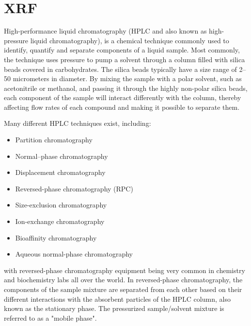 

\section{XRF}

High-performance liquid chromatography (HPLC and also known as high-pressure liquid chromatography), is a chemical technique commonly used to identify, quantify and separate components of a liquid sample. Most commonly, the technique uses pressure to pump a solvent through a column filled with silica beads covered in carbohydrates. The silica beads typically have a size range of 2–50 micrometers in diameter. By mixing the sample with a polar solvent, such as acetonitrile or methanol, and passing it through the highly non-polar silica beads, each component of the sample will interact differently with the column, thereby affecting flow rates of each compound and making it possible to separate them. 

Many different HPLC techniques exist, including:
\begin{itemize}
    \item Partition chromatography
    \item Normal–phase chromatography
    \item Displacement chromatography
    \item Reversed-phase chromatography (RPC)
    \item Size-exclusion chromatography
    \item Ion-exchange chromatography
    \item Bioaffinity chromatography
    \item Aqueous normal-phase chromatography
\end{itemize}
with reversed-phase chromatography equipment being very common in chemistry and biochemistry labs all over the world. In reversed-phase chromatography, the components of the sample mixture are separated from each other based on their different interactions with the absorbent particles of the HPLC column, also known as the stationary phase. The pressurized sample/solvent mixture is referred to as a "mobile phase".

